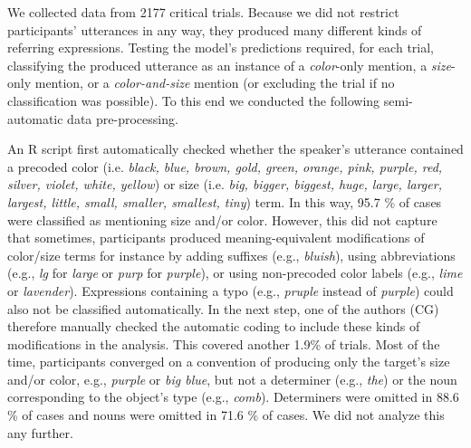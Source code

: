 \documentclass[11pt]{article}
\begin{document}
We collected data from 2177 critical trials. Because we did not restrict participants' utterances in any way, they produced many different kinds of referring expressions. Testing the model's predictions required, for each trial, classifying the produced utterance as an instance of a \emph{color}-only mention, a \emph{size}-only mention, or a \emph{color-and-size} mention (or excluding the trial if no classification was possible). To this end we conducted the following semi-automatic data pre-processing. 

An R script first automatically checked whether the speaker's utterance contained a precoded color (i.e. \emph{black, blue, brown, gold, green, orange, pink, purple, red, silver, violet, white, yellow}) or size (i.e. \emph{big, bigger, biggest, huge, large, larger, largest, little, small, smaller, smallest, tiny}) term. In this way, 95.7 \% of cases were classified as mentioning size and/or color. However, this did not capture that sometimes, participants produced meaning-equivalent modifications of color/size terms for instance by adding suffixes (e.g., \emph{bluish}), using abbreviations (e.g., \emph{lg} for \emph{large} or \emph{purp} for \emph{purple}), or using non-precoded color labels (e.g., \emph{lime} or \emph{lavender}). Expressions containing a typo (e.g., \emph{pruple} instead of \emph{purple}) could also not be classified automatically. In the next step, one of the authors (CG) therefore manually checked the automatic coding to include these kinds of modifications in the analysis. This covered another 1.9\% of trials. Most of the time, participants converged on a convention of producing only the target's size and/or color, e.g., \emph{purple} or \emph{big blue}, but not a determiner (e.g., \emph{the}) or the noun corresponding to the object's type  (e.g., \emph{comb}). Determiners were omitted in 88.6 \% of cases and nouns were omitted in 71.6 \% of cases. We did not analyze this any further.
\end{document}
